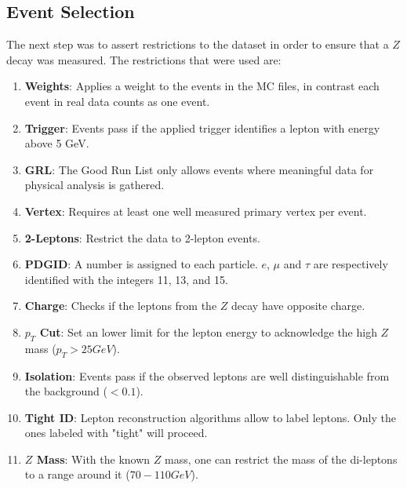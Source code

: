 \documentclass[12pt, a4paper, bibliography=totoc]{scrartcl}
\begin{document}
\begin{multicols}{2}
\subsection{Event Selection} 
The next step was to assert restrictions to the dataset in order to ensure that a $Z$ decay was measured.
The restrictions that were used are:
\begin{enumerate}
    \item \textbf{Weights}: Applies a weight to the events in the MC files, in contrast each event in real data counts as one event.
    \item \textbf{Trigger}: Events pass if the applied trigger identifies a lepton with energy above 5 \si{GeV}.
    \item \textbf{GRL}: The Good Run List only allows events where meaningful data for physical analysis is gathered.
    \item \textbf{Vertex}: Requires at least one well measured primary vertex per event.
    \item \textbf{2-Leptons}: Restrict the data to 2-lepton events.
    \item \textbf{PDGID}: A number is assigned to each particle. $e$, $\mu$ and $\tau$ are respectively identified with the integers 11, 13, and 15.
    \item \textbf{Charge}: Checks if the leptons from the $Z$ decay have opposite charge.
    \item \textbf{$p_{T}$ Cut}: Set an lower limit for the lepton energy to acknowledge the high $Z$ mass ($p_{T} > 25 \si{GeV}$).
    \item \textbf{Isolation}: Events pass if the observed leptons are well distinguishable from the background ($< 0.1$).
    \item \textbf{Tight ID}: Lepton reconstruction algorithms allow to label leptons. Only the ones labeled with "tight" will proceed.
    \item \textbf{$Z$ Mass}: With the known $Z$ mass, one can restrict the mass of the di-leptons to a range around it ($70 - 110 \si{GeV}$). 
\end{enumerate}


\end{multicols}
\end{document}
